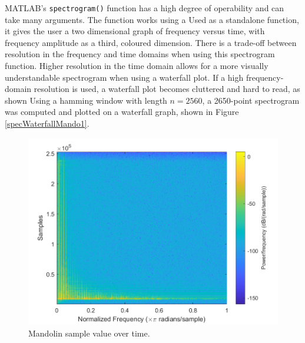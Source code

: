 \documentclass{article}
\begin{document}
            MATLAB's \texttt{spectrogram()} function has a high degree of operability and can take many arguments.
            The function works using a 
            Used as a standalone function, it gives the user a two dimensional graph of frequency versus time, with frequency amplitude as a third, coloured dimension.
            There is a trade-off between resolution in the frequency and time domains when using this spectrogram function.
            Higher resolution in the time domain allows for a more visually understandable spectrogram when using a waterfall plot.
            If a high frequency-domain resolution is used, a waterfall plot becomes cluttered and hard to read, as shown 
            Using a hamming window with length $n = 2560$, a 2650-point spectrogram was computed and plotted on a waterfall graph, shown in Figure \ref{specWaterfallMando1}.
            \begin{figure}[h]
                \includegraphics[scale=0.5]{images/specMando.png}%
                \centering
                \caption{Mandolin sample value over time.}
                \label{specMando1}
            \end{figure}
\end{document}
